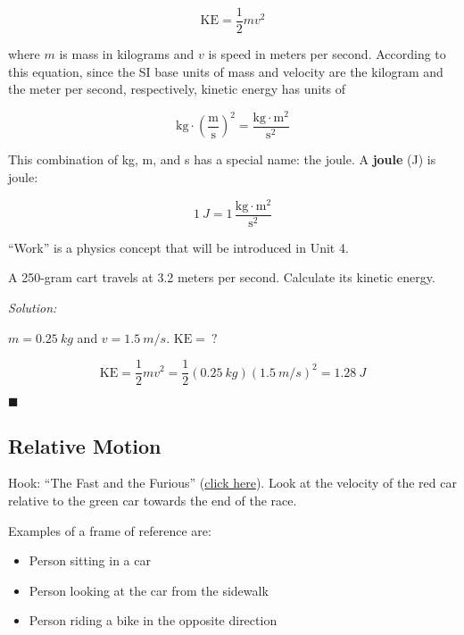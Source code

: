 \documentclass[dvipsnames]{article}
\begin{document}
\begin{equation*}
    \mathrm{KE} = \frac{1}{2} m v^2
\end{equation*}

where $m$ is mass in kilograms and $v$ is speed in meters per second. According to this equation, since the SI base units of mass and velocity are the kilogram and the meter per second, respectively, kinetic energy has units of

\begin{equation*}
    \mathrm{kg} \cdot \left(\mathrm{\frac{m}{s}}\right)^2 = \mathrm{\frac{kg\cdot m^2}{s^2}}
\end{equation*}

This combination of kg, m, and s has a special name: the joule. A \textbf{\gls{joule}} (J) is \glsdesc{joule}:

\begin{equation*}
    \SI{1}{J} = 1\,\mathrm{\frac{kg\cdot m^2}{s^2}}
\end{equation*}

``Work'' is a physics concept that will be introduced in Unit 4.

\begin{example}
A 250-gram cart travels at 3.2 meters per second. Calculate its kinetic energy. 
\end{example}

\textit{Solution:}

$m = \SI{0.25}{kg}$ and $v = \SI{1.5}{m/s}$. $\mathrm{KE} =\ ?$

\begin{equation*}
    \mathrm{KE} = \frac{1}{2} mv^2 = \frac{1}{2}(\SI{0.25}{kg})(\SI{1.5}{m/s})^2 = \boxed{\SI{1.28}{J}} 
\end{equation*}

\hfill $\blacksquare$


\subsection{Relative Motion}


Hook: ``The Fast and the Furious'' (\href{https://youtu.be/yWiSjVHCT30?feature=shared&t=238}{click here}). Look at the velocity of the red car relative to the green car towards the end of the race.


Examples of a frame of reference are:

\begin{itemize}[itemsep=0pt,topsep=0pt]
    \item Person sitting in a car
    \item Person looking at the car from the sidewalk
    \item Person riding a bike in the opposite direction
\end{itemize}
\end{document}
